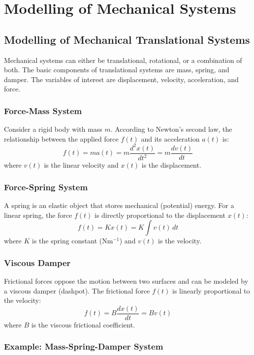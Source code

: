 \documentclass[../notes-main.tex]{subfiles}
\begin{document}
\section{Modelling of Mechanical Systems}

\subsection{Modelling of Mechanical Translational Systems}

Mechanical systems can either be translational, rotational, or a combination of both. The basic components of translational systems are mass, spring, and damper. The variables of interest are displacement, velocity, acceleration, and force.

\subsubsection{Force-Mass System}

Consider a rigid body with mass \( m \). According to Newton’s second law, the relationship between the applied force \( f(t) \) and its acceleration \( a(t) \) is:
\[
f(t) = m a(t) = m \frac{d^2x(t)}{dt^2} = m \frac{dv(t)}{dt}
\]
where \( v(t) \) is the linear velocity and \( x(t) \) is the displacement.

\subsubsection{Force-Spring System}

A spring is an elastic object that stores mechanical (potential) energy. For a linear spring, the force \( f(t) \) is directly proportional to the displacement \( x(t) \):
\[
f(t) = K x(t) = K \int v(t) \, dt
\]
where \( K \) is the spring constant (Nm\(^{-1}\)) and \( v(t) \) is the velocity.

\subsubsection{Viscous Damper}

Frictional forces oppose the motion between two surfaces and can be modeled by a viscous damper (dashpot). The frictional force \( f(t) \) is linearly proportional to the velocity:
\[
f(t) = B \frac{dx(t)}{dt} = B v(t)
\]
where \( B \) is the viscous frictional coefficient.

\subsubsection{Example: Mass-Spring-Damper System}
\end{document}
